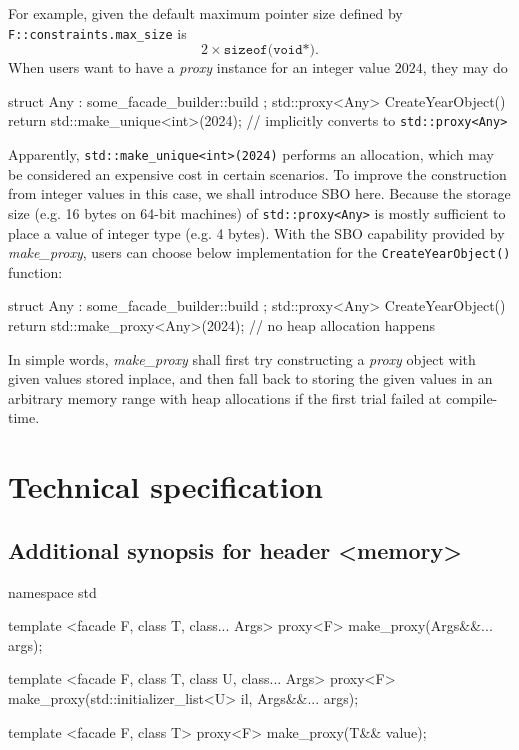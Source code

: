 \documentclass[10pt, a4paper, oneside]{article}
\begin{document}
For example, given the default maximum pointer size defined by \verb|F::constraints.max_size| is\\
\begin{equation*}
2 \times \texttt{sizeof(void*)}.
\end{equation*}
When users want to have a \textit{proxy} instance for an integer value $2024$, they may do
\begin{codeblock}
struct Any : some_facade_builder::build {};
std::proxy<Any> CreateYearObject() {
  return std::make_unique<int>(2024);  // implicitly converts to \verb|std::proxy<Any>|
}
\end{codeblock}
Apparently, \verb|std::make_unique<int>(2024)| performs an allocation,
which may be considered an expensive cost in certain scenarios.
To improve the construction from integer values in this case,
we shall introduce SBO here.
Because the storage size (e.g. 16 bytes on 64-bit machines) of \verb|std::proxy<Any>| is mostly sufficient to place a value of integer type (e.g. 4 bytes).
With the SBO capability provided by \textit{make\_proxy}, users can choose below implementation for the \verb|CreateYearObject()| function:
\begin{codeblock}
struct Any : some_facade_builder::build {};
std::proxy<Any> CreateYearObject() {
  return std::make_proxy<Any>(2024);  // no heap allocation happens
}
\end{codeblock}
In simple words,
\textit{make\_proxy} shall first try constructing a \textit{proxy} object with given values stored inplace,
and then fall back to storing the given values in an arbitrary memory range with heap allocations if the first trial failed at compile-time.

\section{Technical specification}
\subsection{Additional synopsis for header \textless memory\textgreater}

\begin{codeblock}
namespace std {
  template <facade F, class T, class... Args>
  proxy<F> make_proxy(Args&&... args);
  
  template <facade F, class T, class U, class... Args>
  proxy<F> make_proxy(std::initializer_list<U> il, Args&&... args);
  
  template <facade F, class T>
  proxy<F> make_proxy(T&& value);
}
\end{codeblock}
\end{document}
